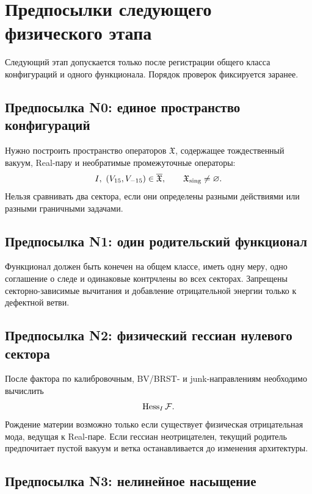 \section{Предпосылки следующего физического этапа}

Следующий этап допускается только после регистрации общего класса
конфигураций и одного функционала. Порядок проверок фиксируется заранее.

\subsection*{Предпосылка N0: единое пространство конфигураций}

Нужно построить пространство операторов $\mathfrak X$, содержащее
тождественный вакуум, Real-пару и необратимые промежуточные операторы:
\begin{equation}
 I,\ (V_{15},V_{-15})\in\overline{\mathfrak X},
 \qquad
 \mathfrak X_{\rm sing}\ne\varnothing.
\end{equation}
Нельзя сравнивать два сектора, если они определены разными действиями или
разными граничными задачами.

\subsection*{Предпосылка N1: один родительский функционал}

Функционал должен быть конечен на общем классе, иметь одну меру, одно
соглашение о следе и одинаковые контрчлены во всех секторах. Запрещены
секторно-зависимые вычитания и добавление отрицательной энергии только к
дефектной ветви.

\subsection*{Предпосылка N2: физический гессиан нулевого сектора}

После фактора по калибровочным, BV/BRST- и junk-направлениям необходимо
вычислить
\begin{equation}
 \operatorname{Hess}_{I}\mathcal F.
\end{equation}
Рождение материи возможно только если существует физическая отрицательная
мода, ведущая к Real-паре. Если гессиан неотрицателен, текущий родитель
предпочитает пустой вакуум и ветка останавливается до изменения
архитектуры.

\subsection*{Предпосылка N3: нелинейное насыщение}

